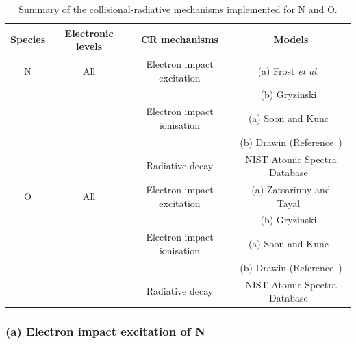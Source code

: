 {\begin{table}[h]
 \center
 \caption{Summary of the collisional-radiative mechanisms implemented for N and O.}
 \label{tab:N-O-CR}
 \begin{tabular*}{1.0\textwidth}{cccc}
  \hline Species                         & Electronic levels & CR mechanisms                                & Models    \\
  \hline  
                  N                                & All & Electron impact excitation                & (a) Frost \textit{et al.}~\cite{FAS+1998} \\
                                                     &       &                                                               & (b) Gryzinski~\cite{Gryz59} \\
                                                     &       & Electron impact ionisation               & (a) Soon and Kunc~\cite{SK1990} \\
                                                     &       &                                                               & (b) Drawin (Reference~\cite{panesi_phd}) \\
                                                     &       & Radiative decay                                 & NIST Atomic Spectra Database~\cite{NIST_ASD} \\
                  O                                & All & Electron impact excitation                & (a) Zatsarinny and Tayal~\cite{ZT2003} \\
                                                     &       &                                                               & (b) Gryzinski~\cite{Gryz59} \\
                                                     &       & Electron impact ionisation               & (a) Soon and Kunc~\cite{SK1990} \\
                                                     &       &                                                               & (b) Drawin (Reference~\cite{panesi_phd}) \\
                                                     &       & Radiative decay                                 & NIST Atomic Spectra Database~\cite{NIST_ASD} \\                                   
  \hline
 \end{tabular*}
\end{table}

\subsubsection{(a) Electron impact excitation of N}

}
